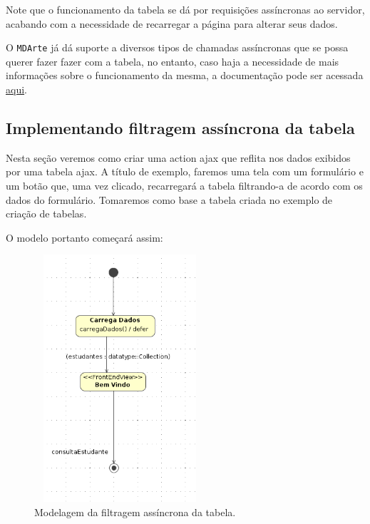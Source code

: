 Note que o funcionamento da tabela se dá por requisições assíncronas
ao servidor, acabando com a necessidade de recarregar a página para alterar seus
dados. 

O \texttt{MDArte} já dá suporte a diversos tipos de chamadas assíncronas que se
possa querer fazer fazer com a tabela, no entanto, caso haja a necessidade de
mais informações sobre o funcionamento da mesma, a documentação pode ser
acessada \href{http://www.jtable.org/Home/Documents}{aqui}.

\subsection{Implementando filtragem assíncrona da tabela}
Nesta seção veremos como criar uma action ajax que reflita nos dados exibidos
por uma tabela ajax. A título de exemplo, faremos uma tela com um formulário e
um botão que, uma vez clicado, recarregará a tabela filtrando-a de acordo com os
dados do formulário. Tomaremos como base a tabela criada no exemplo de criação
de tabelas.

O modelo portanto começará assim:

\begin{figure}[H]
	\centering
	\includegraphics[width=180pt,height=260pt]{files/imgs/tutorial-mdarte-0040.png}
	\caption{Modelagem da filtragem assíncrona da tabela.}
	\label{modelando_filtragem_assincrona}
\end{figure}

